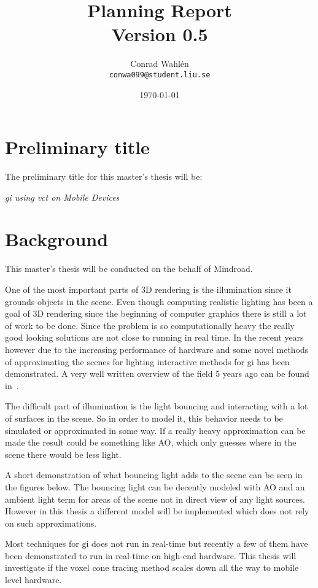 \documentclass[a4paper, 12pt]{article}
\title{Planning Report \\ \small{Version 0.5}}
\author{Conrad Wahlén \\ \texttt{conwa099@student.liu.se}}
\date{\today}
\begin{document}
\maketitle
\thispagestyle{empty}
\newpage


\section{Preliminary title}
\label{sec:Preliminary title}

The preliminary title for this master's thesis will be:

\textit{\acrlong{gi} using \acrlong{vct} on Mobile Devices}

\section{Background}
\label{sec:Background}

This master's thesis will be conducted on the behalf of Mindroad.

One of the most important parts of 3D rendering is the illumination since it grounds objects in the scene. Even though computing realistic lighting has been a goal of 3D rendering since the beginning of computer graphics there is still a lot of work to be done. Since the problem is so computationally heavy the really good looking solutions are not close to running in real time.
In the recent years however due to the increasing performance of hardware and some novel methods of approximating the scenes for lighting interactive methods for gi has been demonstrated. A very well written overview of the field 5 years ago can be found in~\cite{sotagi}.

The difficult part of illumination is the light bouncing and interacting with a lot of surfaces in the scene. So in order to model it, this behavior needs to be simulated or approximated in some way. If a really heavy approximation can be made the result could be something like AO, which only guesses where in the scene there would be less light.

A short demonstration of what bouncing light adds to the scene can be seen in the figures below. The bouncing light can be decently modeled with AO and an ambient light term for areas of the scene not in direct view of any light sources. However in this thesis a different model will be implemented which does not rely on such approximations.

Most techniques for gi does not run in real-time but recently a few of them have been demonstrated to run in real-time on high-end hardware. This thesis will investigate if the voxel cone tracing method scales down all the way to mobile level hardware.
\end{document}

